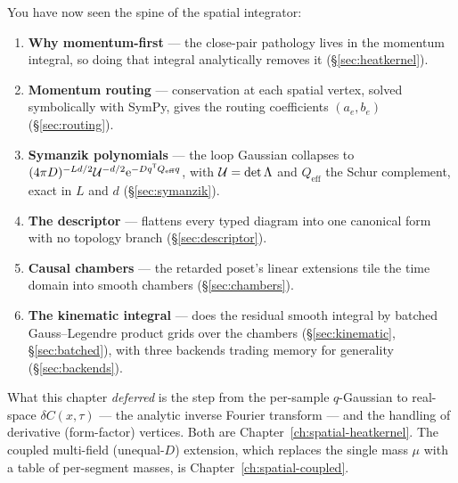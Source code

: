 You have now seen the spine of the spatial integrator:
\begin{enumerate}
  \item \textbf{Why momentum-first} --- the close-pair pathology lives in the
        momentum integral, so doing that integral analytically removes it
        (\S\ref{sec:heatkernel}).
  \item \textbf{Momentum routing} --- conservation at each spatial vertex, solved
        symbolically with SymPy, gives the routing coefficients $(a_e,b_e)$
        (\S\ref{sec:routing}).
  \item \textbf{Symanzik polynomials} --- the loop Gaussian collapses to
        $(4\pi D)^{-Ld/2}\mathcal{U}^{-d/2}\mathrm{e}^{-Dq^{\mathsf T}Q_{\text{eff}}q}$, with
        $\mathcal{U}=\det\Lambda$ and $Q_{\text{eff}}$ the Schur complement, exact in $L$
        and $d$ (\S\ref{sec:symanzik}).
  \item \textbf{The descriptor} ---  flattens every
        typed diagram into one canonical form with no topology branch
        (\S\ref{sec:descriptor}).
  \item \textbf{Causal chambers} --- the retarded poset's linear extensions tile
        the time domain into smooth chambers (\S\ref{sec:chambers}).
  \item \textbf{The kinematic integral} ---  does the
        residual smooth integral by batched Gauss--Legendre product grids over the
        chambers (\S\ref{sec:kinematic}, \S\ref{sec:batched}), with three backends
        trading memory for generality (\S\ref{sec:backends}).
\end{enumerate}

What this chapter \emph{deferred} is the step from the per-sample $q$-Gaussian to
real-space $\delta C(x,\tau)$ --- the analytic inverse Fourier transform --- and
the handling of derivative (form-factor) vertices. Both are
Chapter~\ref{ch:spatial-heatkernel}. The coupled multi-field (unequal-$D$)
extension, which replaces the single mass $\mu$ with a table of per-segment masses,
is Chapter~\ref{ch:spatial-coupled}.
